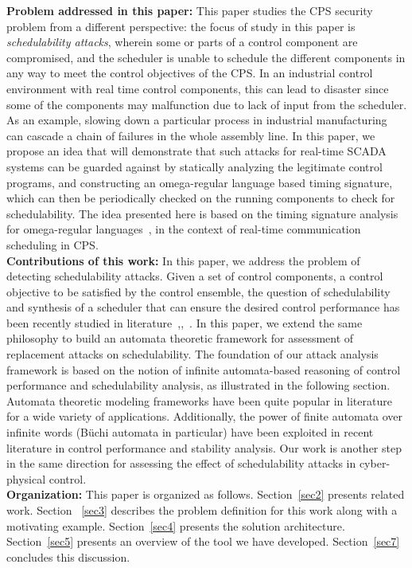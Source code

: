 \noindent
{\bf Problem addressed in this paper:} This paper studies the CPS security problem from a different perspective: the focus of study in this paper is {\em schedulability attacks}, wherein some or parts of a control component are compromised, and the scheduler is unable to schedule the different components in any way to meet the control objectives of the CPS.  In an industrial control environment with real time control components, this can lead to disaster since some of the components may malfunction due to lack of input from the scheduler. As an example, slowing down a
particular process in industrial manufacturing can cascade a chain of failures in the whole
assembly line. In this paper, we propose an idea that will demonstrate that such
attacks for real-time SCADA systems can be guarded against by statically analyzing the
legitimate control programs, and constructing an omega-regular language based timing signature,
which can then be periodically checked on the running components to check for schedulability. The idea presented here is based on the timing signature analysis for omega-regular languages~\cite{WeissFAA09}, in the context of real-time communication scheduling in CPS. \\

\noindent
{\bf Contributions of this work:}
In this paper, we address the problem of detecting schedulability attacks. Given a set of control components, a control objective 
to be satisfied by the control ensemble, the question of schedulability and 
synthesis of a scheduler that can ensure the desired control performance has been recently studied in literature~\cite{WeissFAA09},\cite{AlurW08},~\cite{GhoshMDHD16}. 
In this paper, we extend the same philosophy to build an automata theoretic framework for assessment of replacement attacks on schedulability. 
The foundation of our attack analysis framework is based on the notion of infinite automata-based reasoning of control performance and schedulability analysis, 
as illustrated in the following section. Automata theoretic modeling frameworks have been quite popular in literature for a wide variety of applications. Additionally, 
the power of finite automata over infinite words (B\"{u}chi automata in particular) have been exploited in recent literature in control performance and stability analysis.
Our work is another step in the same direction for assessing the effect of schedulability attacks in cyber-physical control. \\


\noindent
{\bf Organization:} This paper is organized as follows. Section~\ref{sec2} presents related work. Section ~\ref{sec3} describes the problem definition for this work along with a motivating example. Section~\ref{sec4} presents the solution architecture. Section~\ref{sec5} presents an overview of the tool we have developed. Section~\ref{sec7} concludes this discussion.
